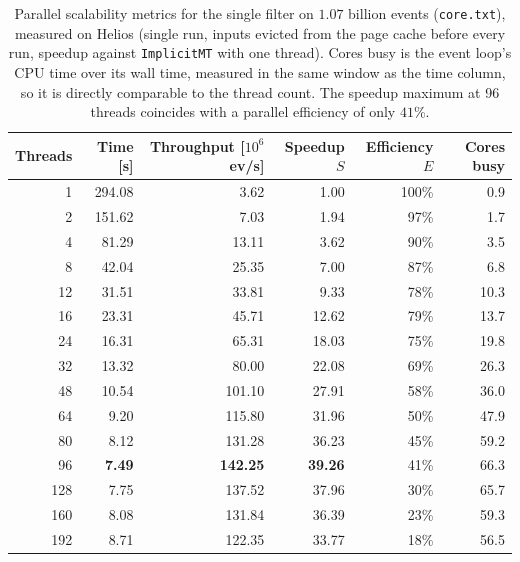 \begin{table}[htbp]
\centering
\caption{Parallel scalability metrics for the single filter on $1.07$ billion events (\texttt{core.txt}), measured on Helios (single run, inputs evicted from the page cache before every run, speedup against \texttt{ImplicitMT} with one thread). Cores busy is the event loop's CPU time over its wall time, measured in the same window as the time column, so it is directly comparable to the thread count. The speedup maximum at 96 threads coincides with a parallel efficiency of only $41\%$.}
\label{tab:scalability-filter}
\begin{tabular}{rrrrrr}
\toprule
Threads & Time [s] & Throughput [$10^6$ ev/s] & Speedup $S$ & Efficiency $E$ & Cores busy \\
\midrule
 1 & 294.08 & 3.62 & 1.00 & 100\% & 0.9 \\
 2 & 151.62 & 7.03 & 1.94 & 97\% & 1.7 \\
 4 & 81.29 & 13.11 & 3.62 & 90\% & 3.5 \\
 8 & 42.04 & 25.35 & 7.00 & 87\% & 6.8 \\
12 & 31.51 & 33.81 & 9.33 & 78\% & 10.3 \\
16 & 23.31 & 45.71 & 12.62 & 79\% & 13.7 \\
24 & 16.31 & 65.31 & 18.03 & 75\% & 19.8 \\
32 & 13.32 & 80.00 & 22.08 & 69\% & 26.3 \\
48 & 10.54 & 101.10 & 27.91 & 58\% & 36.0 \\
64 & 9.20 & 115.80 & 31.96 & 50\% & 47.9 \\
80 & 8.12 & 131.28 & 36.23 & 45\% & 59.2 \\
96 & \textbf{7.49} & \textbf{142.25} & \textbf{39.26} & 41\% & 66.3 \\
128 & 7.75 & 137.52 & 37.96 & 30\% & 65.7 \\
160 & 8.08 & 131.84 & 36.39 & 23\% & 59.3 \\
192 & 8.71 & 122.35 & 33.77 & 18\% & 56.5 \\
\bottomrule
\end{tabular}
\end{table}
